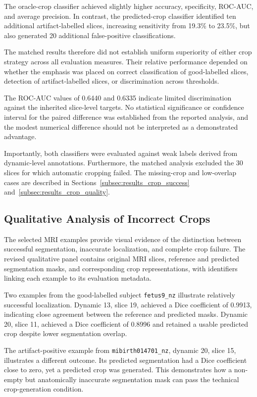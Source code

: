 The oracle-crop classifier achieved slightly higher accuracy, specificity, ROC-AUC, and average precision. In contrast, the predicted-crop classifier identified ten additional artifact-labelled slices, increasing sensitivity from 19.3\% to 23.5\%, but also generated 20 additional false-positive classifications.

The matched results therefore did not establish uniform superiority of either crop strategy across all evaluation measures. Their relative performance depended on whether the emphasis was placed on correct classification of good-labelled slices, detection of artifact-labelled slices, or discrimination across thresholds.

The ROC-AUC values of 0.6440 and 0.6335 indicate limited discrimination against the inherited slice-level targets. No statistical significance or confidence interval for the paired difference was established from the reported analysis, and the modest numerical difference should not be interpreted as a demonstrated advantage.

Importantly, both classifiers were evaluated against weak labels derived from dynamic-level annotations. Furthermore, the matched analysis excluded the 30 slices for which automatic cropping failed. The missing-crop and low-overlap cases are described in Sections~\ref{subsec:results_crop_success} and~\ref{subsec:results_crop_quality}.

\subsection{Qualitative Analysis of Incorrect Crops}
\label{subsec:results_crop_qualitative}

The selected MRI examples provide visual evidence of the distinction between successful segmentation, inaccurate localization, and complete crop failure. The revised qualitative panel contains original MRI slices, reference and predicted segmentation masks, and corresponding crop representations, with identifiers linking each example to its evaluation metadata.

Two examples from the good-labelled subject \texttt{fetus9\_nz} illustrate relatively successful localization. Dynamic 13, slice 19, achieved a Dice coefficient of 0.9913, indicating close agreement between the reference and predicted masks. Dynamic 20, slice 11, achieved a Dice coefficient of 0.8996 and retained a usable predicted crop despite lower segmentation overlap.

The artifact-positive example from \texttt{mibirth014701\_nz}, dynamic 20, slice 15, illustrates a different outcome. Its predicted segmentation had a Dice coefficient close to zero, yet a predicted crop was generated. This demonstrates how a non-empty but anatomically inaccurate segmentation mask can pass the technical crop-generation condition.

